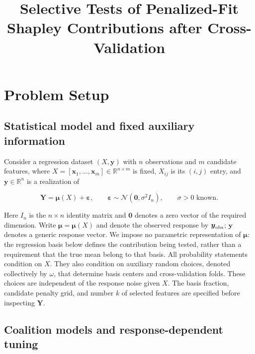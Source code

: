 \documentclass[
  11pt,
]{article}
\title{Selective Tests of Penalized-Fit Shapley Contributions after
Cross-Validation}
\author{}
\date{}
\begin{document}
\maketitle

\setcounter{section}{1}

\section{Problem Setup}\label{problem-setup}

\subsection{Statistical model and fixed auxiliary
information}\label{statistical-model-and-fixed-auxiliary-information}

Consider a regression dataset \((X,\boldsymbol y)\) with \(n\)
observations and \(m\) candidate features, where
\(X=[\boldsymbol x_1,\ldots,\boldsymbol x_m]\in\mathbb R^{n\times m}\)
is fixed, \(X_{ij}\) is its \((i,j)\) entry, and
\(\boldsymbol y\in\mathbb R^n\) is a realization of

\[
\boldsymbol Y=\boldsymbol\mu(X)+\boldsymbol\varepsilon,\qquad
\boldsymbol\varepsilon\sim \mathcal N(\boldsymbol0,\sigma^2 I_n),\qquad \sigma>0\text{ known}.
\tag{1}
\]

Here \(I_n\) is the \(n\times n\) identity matrix and \(\boldsymbol0\)
denotes a zero vector of the required dimension. Write
\(\boldsymbol\mu=\boldsymbol\mu(X)\) and denote the observed response by
\(\boldsymbol y_{\rm obs}\); \(\boldsymbol y\) denotes a generic
response vector. We impose no parametric representation of
\(\boldsymbol\mu\): the regression basis below defines the contribution
being tested, rather than a requirement that the true mean belong to
that basis. All probability statements condition on \(X\). They also
condition on auxiliary random choices, denoted collectively by
\(\omega\), that determine basis centers and cross-validation folds.
These choices are independent of the response noise given \(X\). The
basis fraction, candidate penalty grid, and number \(k\) of selected
features are specified before inspecting \(\boldsymbol Y\).

\subsection{Coalition models and response-dependent
tuning}\label{coalition-models-and-response-dependent-tuning}
\end{document}
